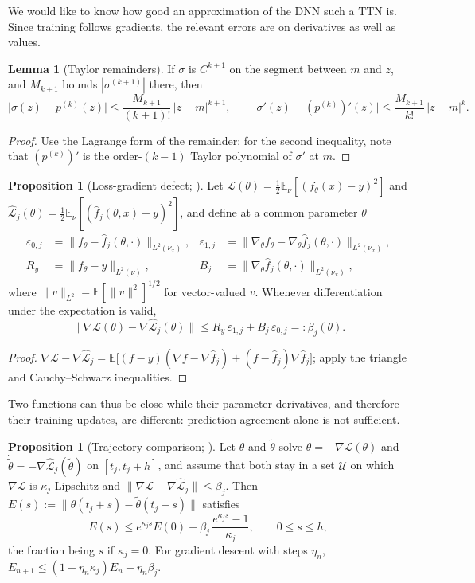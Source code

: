 \documentclass[11pt]{article}
\newcommand{\E}{\mathbb{E}}
\newcommand{\norm}[1]{\lVert #1\rVert}
\newcommand{\Lhat}{\widehat{\mathcal L}}
\newcommand{\fhat}{\hat f}
\theoremstyle{definition}
\newtheorem{proposition}[theorem]{Proposition}
\newtheorem{lemma}[theorem]{Lemma}
\numberwithin{equation}{section}
\begin{document}
We would like to know how good an approximation of the DNN such a TTN is. Since training follows gradients, the relevant errors are on derivatives as well as values.

\begin{lemma}[Taylor remainders]\label{lem:taylor}
If $\sigma$ is $C^{k+1}$ on the segment between $m$ and $z$, and $M_{k+1}$ bounds $|\sigma^{(k+1)}|$ there, then
\[
\big|\sigma(z)-p^{(k)}(z)\big|\le\frac{M_{k+1}}{(k+1)!}\,|z-m|^{k+1},\qquad
\big|\sigma'(z)-(p^{(k)})'(z)\big|\le\frac{M_{k+1}}{k!}\,|z-m|^{k}.
\]
\end{lemma}

\begin{proof}
Use the Lagrange form of the remainder; for the second inequality, note that $(p^{(k)})'$ is the order-$(k-1)$ Taylor polynomial of $\sigma'$ at $m$.
\end{proof}

\begin{proposition}[Loss-gradient defect; {\citealp[Proposition~2]{hfl_local}}]\label{prop:defect}
Let $\mathcal L(\theta)=\frac12\E_\nu[(f_\theta(x)-y)^2]$ and $\Lhat_j(\theta)=\frac12\E_\nu[(\fhat_j(\theta,x)-y)^2]$, and define at a common parameter $\theta$
\begin{align*}
\varepsilon_{0,j}&=\norm{f_\theta-\fhat_j(\theta,\cdot)}_{L^2(\nu_x)}, &
\varepsilon_{1,j}&=\norm{\nabla_\theta f_\theta-\nabla_\theta\fhat_j(\theta,\cdot)}_{L^2(\nu_x)},\\
R_y&=\norm{f_\theta-y}_{L^2(\nu)}, &
B_j&=\norm{\nabla_\theta\fhat_j(\theta,\cdot)}_{L^2(\nu_x)},
\end{align*}
where $\norm{v}_{L^2}=\E[\norm{v}^2]^{1/2}$ for vector-valued $v$. Whenever differentiation under the expectation is valid,
\[
\norm{\nabla\mathcal L(\theta)-\nabla\Lhat_j(\theta)}\le R_y\,\varepsilon_{1,j}+B_j\,\varepsilon_{0,j}=:\beta_j(\theta).
\]
\end{proposition}

\begin{proof}
$\nabla\mathcal L-\nabla\Lhat_j=\E\big[(f-y)(\nabla f-\nabla\fhat_j)+(f-\fhat_j)\nabla\fhat_j\big]$; apply the triangle and Cauchy--Schwarz inequalities.
\end{proof}

Two functions can thus be close while their parameter derivatives, and therefore their training updates, are different: prediction agreement alone is not sufficient.

\begin{proposition}[Trajectory comparison; {\citealp[Section~6]{hfl_local}}]\label{prop:gronwall}
Let $\theta$ and $\tilde\theta$ solve $\dot\theta=-\nabla\mathcal L(\theta)$ and $\dot{\tilde\theta}=-\nabla\Lhat_j(\tilde\theta)$ on $[t_j,t_j+h]$, and assume that both stay in a set $\mathcal U$ on which $\nabla\mathcal L$ is $\kappa_j$-Lipschitz and $\norm{\nabla\mathcal L-\nabla\Lhat_j}\le\beta_j$. Then $E(s):=\norm{\theta(t_j+s)-\tilde\theta(t_j+s)}$ satisfies
\[
E(s)\le e^{\kappa_js}E(0)+\beta_j\,\frac{e^{\kappa_js}-1}{\kappa_j},\qquad0\le s\le h,
\]
the fraction being $s$ if $\kappa_j=0$. For gradient descent with steps $\eta_n$, $E_{n+1}\le(1+\eta_n\kappa_j)E_n+\eta_n\beta_j$.
\end{proposition}
\end{document}

